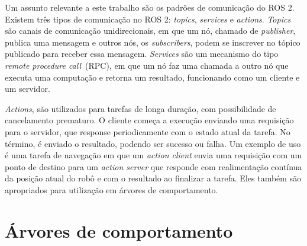 \documentclass[repeatfields,xlists,xpacks,oneside,yearsonly]{ufrgscca}
\begin{document}
Um assunto relevante a este trabalho são os padrões de comunicação do ROS 2.
Existem três tipos de comunicação no ROS 2: \textit{topics}, \textit{services} e \textit{actions}.
\textit{Topics} são canais de comunicação unidirecionais, em que um nó, chamado de \textit{publisher},
publica uma mensagem e outros nós, os \textit{subscribers}, podem se inscrever no tópico publicado
para receber essa mensagem.
\textit{Services} são um mecanismo do tipo \textit{remote procedure call}~(RPC),
em que um nó faz uma chamada a outro nó que executa uma computação e retorna um resultado,
funcionando como um cliente e um servidor.

\textit{Actions}, são utilizados para tarefas de longa duração, com possibilidade de
cancelamento prematuro.
O cliente começa a execução enviando uma requisição para o servidor,
que response periodicamente com o estado atual da tarefa.
No término, é enviado o resultado, podendo ser sucesso ou falha.
Um exemplo de uso é uma tarefa de navegação em que um \textit{action client}
envia uma requisição com um ponto de destino para um \textit{action server}
que responde com realimentação contínua da posição atual do robô e
com o resultado ao finalizar a tarefa.
Eles também são apropriados para utilização em árvores de comportamento.

\section{Árvores de comportamento}


\end{document}
